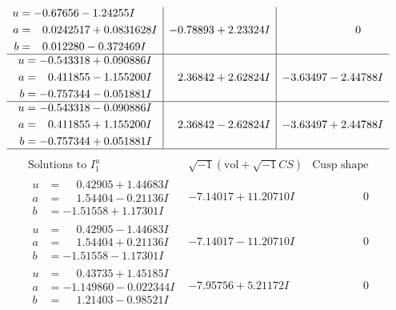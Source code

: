 \documentclass[1p]{elsarticle_modified}
\theoremstyle{definition}
\newcommand{\I}{\sqrt{-1}}
\begin{document}
$$\begin{array}{c|c|c}
\begin{aligned}
u &= -0.67656 - 1.24255 I \\
a &= \phantom{-}0.0242517 + 0.0831628 I \\
b &= \phantom{-}0.012280 - 0.372469 I\end{aligned}
 & -0.78893 + 2.23324 I & \phantom{-0.000000 } 0 \\ \hline\begin{aligned}
u &= -0.543318 + 0.090886 I \\
a &= \phantom{-}0.411855 - 1.155200 I \\
b &= -0.757344 - 0.051881 I\end{aligned}
 & \phantom{-}2.36842 + 2.62824 I & -3.63497 - 2.44788 I \\ \hline\begin{aligned}
u &= -0.543318 - 0.090886 I \\
a &= \phantom{-}0.411855 + 1.155200 I \\
b &= -0.757344 + 0.051881 I\end{aligned}
 & \phantom{-}2.36842 - 2.62824 I & -3.63497 + 2.44788 I\\
 \hline 
 \end{array}$$\newpage$$\begin{array}{c|c|c}  
\text{Solutions to }I^u_{1}& \I (\text{vol} + \sqrt{-1}CS) & \text{Cusp shape}\\
 \hline 
\begin{aligned}
u &= \phantom{-}0.42905 + 1.44683 I \\
a &= \phantom{-}1.54404 - 0.21136 I \\
b &= -1.51558 + 1.17301 I\end{aligned}
 & -7.14017 + 11.20710 I & \phantom{-0.000000 } 0 \\ \hline\begin{aligned}
u &= \phantom{-}0.42905 - 1.44683 I \\
a &= \phantom{-}1.54404 + 0.21136 I \\
b &= -1.51558 - 1.17301 I\end{aligned}
 & -7.14017 - 11.20710 I & \phantom{-0.000000 } 0 \\ \hline\begin{aligned}
u &= \phantom{-}0.43735 + 1.45185 I \\
a &= -1.149860 - 0.022344 I \\
b &= \phantom{-}1.21403 - 0.98521 I\end{aligned}
 & -7.95756 + 5.21172 I & \phantom{-0.000000 } 0 \\ \hline\begin{aligned}

\end{aligned}
\end{array}$$
\end{document}
